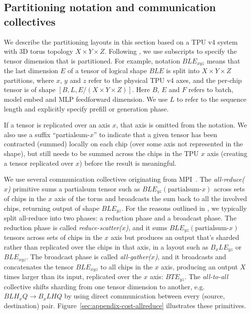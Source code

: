 \subsection{Partitioning notation and communication collectives} We describe the partitioning layouts in this section based on a TPU v4 system with 3D torus topology $X\times Y\times Z$. Following \cite{xu2021gspmd}, we use subscripts to specify the tensor dimension that is partitioned. For example, notation $BLE_{xyz}$ means that the last dimension $E$ of a tensor of logical shape $BLE$ is split into $X\times Y\times Z$ partitions, where $x$, $y$ and $z$ refer to the physical TPU v4 axes, and the per-chip tensor is of shape $[B, L, E/(X\times Y\times Z)]$. Here $B$, $E$ and $F$ refers to batch, model embed and MLP feedforward dimension. We use $L$ to refer to the sequence length and explicitly specify prefill or generation phase. 

If a tensor is replicated over an axis $x$, that axis is omitted from the notation. We also use a suffix ``partialsum-$x$'' to indicate that a given tensor has been contracted (summed) locally on each chip (over some axis not represented in the shape), but still needs to be summed across the chips in the TPU $x$ axis (creating a tensor replicated over $x$) before the result is meaningful.

We use several communication collectives originating from MPI~\cite{clarke1994mpi}. The \emph{all-reduce($x$)} primitive sums a partialsum tensor such as $BLE_{yz}( \textrm{partialsum-}x)$ across sets of chips in the $x$ axis of the torus and broadcasts the sum back to all the involved chips, returning output of shape $BLE_{yz}$. For the reasons outlined in \citet{rajbhandari2020zero}, we typically split all-reduce into two phases: a reduction phase and a broadcast phase. The reduction phase is called \emph{reduce-scatter($x$)}, and it sums $BLE_{yz}(\textrm{partialsum-}x)$ tensors across sets of chips in the $x$ axis but produces an output that's sharded rather than replicated over the chips in that axis, in a layout such as $B_xLE_{yz}$ or $BLE_{xyz}$. The  broadcast phase is called \emph{all-gather($x$)}, and it broadcasts and concatenates the tensor $BLE_{xyz}$ to all chips in the $x$ axis, producing an output $X$ times larger than its input, replicated over the $x$ axis: $BTE_{yz}$. The \emph{all-to-all} collective shifts sharding from one tensor dimension to another, e.g. $BLH_x Q \to B_x LHQ$ by using direct communication between every (source, destination) pair. Figure~\ref{sec:appendix-cost-allreduce} illustrates these primitives.

